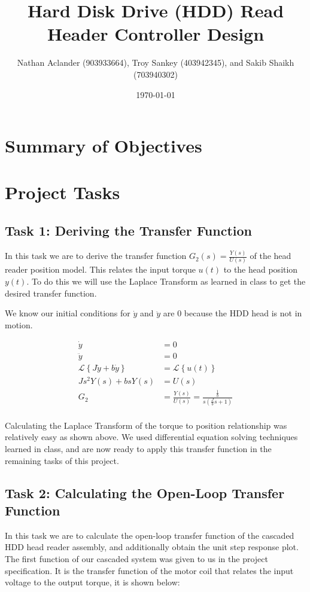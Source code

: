 \documentclass{article}
\title{Hard Disk Drive (HDD) Read Header Controller Design}
\date{\today}
\author{Nathan Aclander (903933664), Troy Sankey (403942345), 
and Sakib Shaikh (703940302)}
\begin{document}
\maketitle
\newpage

\section*{Summary of Objectives}

\section*{Project Tasks}
\subsection*{Task 1: Deriving the Transfer Function}

In this task we are to derive the transfer function $G_2(s) =
\frac{Y(s)}{U(s)}$ of the head reader position model. This relates the
input torque $u(t)$ to the head position $y(t)$. To do this we will
use the Laplace Transform as learned in class to get the desired
transfer function.

We know our initial conditions for $\dot{y}$ and $\ddot{y}$ are $0$
because the HDD head is not in motion.

\begin{align*}
  \dot{y} &= 0 \\
  \ddot{y} &= 0 \\
  \mathcal{L}\left\{ J\ddot{y} + b \dot{y}\right\} &= \mathcal{L}\left\{u(t)\right\} \\
  Js^2 Y(s) + bsY(s) &= U(s) \\
  G_2 &= \frac{Y(s)}{U(s)} = \frac{\frac{1}{b}}{s(\frac{J}{b}s + 1)} \\
\end{align*}

Calculating the Laplace Transform of the torque to position
relationship was relatively easy as shown above. We used differential
equation solving techniques learned in class, and are now ready to
apply this transfer function in the remaining tasks of this project.

\subsection*{Task 2: Calculating the Open-Loop Transfer Function}

In this task we are to calculate the open-loop transfer function of
the cascaded HDD head reader assembly, and additionally obtain the
unit step response plot. The first function of our cascaded system was
given to us in the project specification. It is the transfer function
of the motor coil that relates the input voltage to the output torque,
it is shown below:
\end{document}
